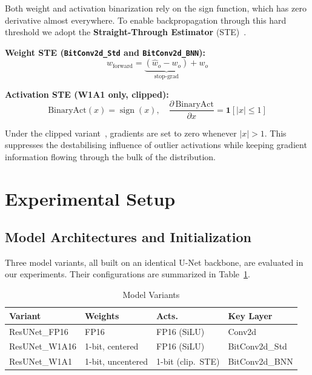 \documentclass[twocolumn, journal]{IEEEtran}
\begin{document}
Both weight and activation binarization rely on the sign function, which has zero
derivative almost everywhere. To enable backpropagation through this hard threshold we
adopt the \textbf{Straight-Through Estimator}
(STE)~\cite{bengio2013ste}.

\textbf{Weight STE (\texttt{BitConv2d\_Std} and \texttt{BitConv2d\_BNN}):}
\begin{equation}
  w_\text{forward} = \underbrace{(\hat{w}_o - w_o)}_{\text{stop-grad}} + w_o
  \label{eq:ste-w}
\end{equation}

\textbf{Activation STE (W1A1 only, clipped):}
\begin{equation}
  \text{BinaryAct}(x) = \operatorname{sign}(x),
  \quad
  \frac{\partial\,\text{BinaryAct}}{\partial x} = \mathbf{1}[|x|\le 1]
  \label{eq:ste-a}
\end{equation}

Under the clipped variant~\cite{courbariaux2016clippedste}, gradients are set to zero
whenever $|x|>1$. This suppresses the destabilising influence of outlier activations
while keeping gradient information flowing through the bulk of the distribution.

\section{Experimental Setup}

\subsection{Model Architectures and Initialization}

Three model variants, all built on an identical U-Net backbone, are evaluated in our
experiments. Their configurations are summarized in Table~\ref{tab:variants}.

\begin{table}[h]
\centering
\caption{Model Variants}
\label{tab:variants}
\footnotesize
\begin{tabular}{@{}llll@{}}
\toprule
\textbf{Variant} & \textbf{Weights} & \textbf{Acts.} & \textbf{Key Layer} \\
\midrule
ResUNet\_FP16  & FP16              & FP16 (SiLU)        & Conv2d \\
ResUNet\_W1A16 & 1-bit, centered   & FP16 (SiLU)        & BitConv2d\_Std \\
ResUNet\_W1A1  & 1-bit, uncentered & 1-bit (clip.\ STE) & BitConv2d\_BNN \\
\bottomrule
\end{tabular}
\end{table}
\end{document}
